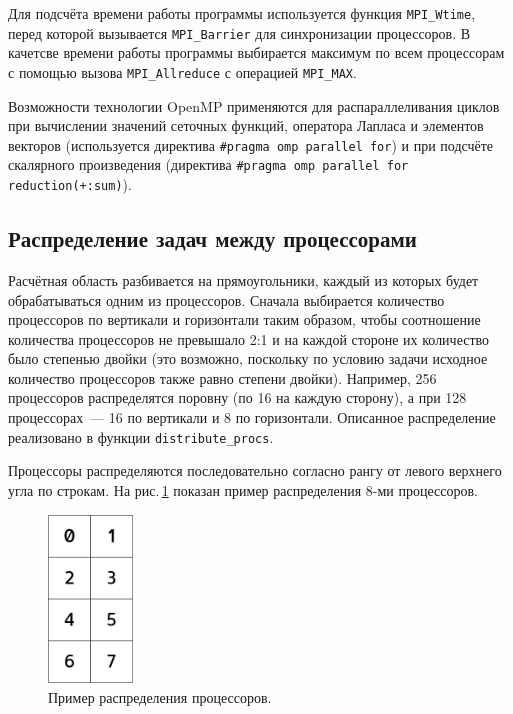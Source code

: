 \documentclass[11pt]{article}
\numberwithin{equation}{section}
\theoremstyle{plain}
\theoremstyle{definition}
\begin{document}
Для подсчёта времени работы программы используется функция \verb|MPI_Wtime|,
перед которой вызывается \verb|MPI_Barrier| для синхронизации процессоров.
В качетсве времени работы программы выбирается максимум по всем процессорам
с помощью вызова \verb|MPI_Allreduce| с операцией \verb|MPI_MAX|.

Возможности технологии OpenMP применяются для распараллеливания циклов
при вычислении значений сеточных функций, оператора Лапласа и элементов
векторов (используется директива
\verb|#pragma omp parallel for|) и при подсчёте скалярного произведения
(директива \verb|#pragma omp parallel for reduction(+:sum)|).

\subsection{Распределение задач между процессорами}
Расчётная область разбивается на прямоугольники, каждый из которых будет
обрабатываться одним из процессоров. Сначала выбирается количество
процессоров по вертикали и горизонтали таким образом, чтобы соотношение
количества процессоров не превышало 2:1 и на каждой стороне их количество
было степенью двойки (это возможно, поскольку по условию задачи исходное
количество процессоров также равно степени двойки). Например, 256 процессоров
распределятся поровну (по 16 на каждую сторону), а при 128 процессорах~---
16 по вертикали и 8 по горизонтали.
Описанное распределение реализовано в функции \verb|distribute_procs|.

Процессоры распределяются последовательно согласно рангу от левого верхнего угла
по строкам. На рис.\,\ref{distr_procs} показан пример распределения 8-ми
процессоров.

\begin{figure}[ht]
    \centering
    \includegraphics[width=0.2\textwidth]{proc_distr.png}
    \caption{Пример распределения процессоров.}
    \label{distr_procs}
\end{figure}
\end{document}
